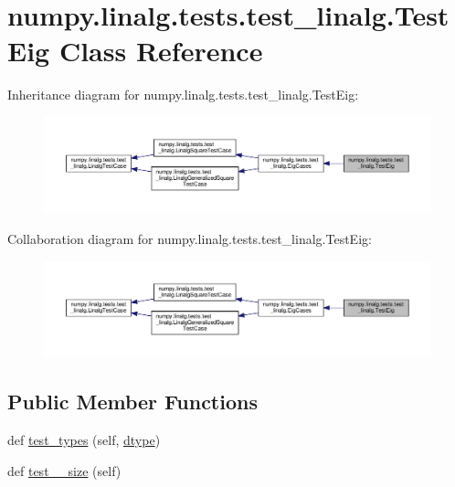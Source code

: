 \hypertarget{classnumpy_1_1linalg_1_1tests_1_1test__linalg_1_1TestEig}{}\section{numpy.\+linalg.\+tests.\+test\+\_\+linalg.\+Test\+Eig Class Reference}
\label{classnumpy_1_1linalg_1_1tests_1_1test__linalg_1_1TestEig}


Inheritance diagram for numpy.\+linalg.\+tests.\+test\+\_\+linalg.\+Test\+Eig\+:
\nopagebreak
\begin{figure}[H]
\begin{center}
\leavevmode
\includegraphics[width=350pt]{classnumpy_1_1linalg_1_1tests_1_1test__linalg_1_1TestEig__inherit__graph}
\end{center}
\end{figure}


Collaboration diagram for numpy.\+linalg.\+tests.\+test\+\_\+linalg.\+Test\+Eig\+:
\nopagebreak
\begin{figure}[H]
\begin{center}
\leavevmode
\includegraphics[width=350pt]{classnumpy_1_1linalg_1_1tests_1_1test__linalg_1_1TestEig__coll__graph}
\end{center}
\end{figure}
\subsection*{Public Member Functions}
\begin{DoxyCompactItemize}
\item 
def \hyperlink{classnumpy_1_1linalg_1_1tests_1_1test__linalg_1_1TestEig_a002546476c51b593c41da6da3ec8fa51}{test\+\_\+types} (self, \hyperlink{namespacenumpy_1_1linalg_1_1tests_1_1test__linalg_a1063ea74fa35b7244592f8a89b8a71a2}{dtype})
\item 
def \hyperlink{classnumpy_1_1linalg_1_1tests_1_1test__linalg_1_1TestEig_a29ac04519b617d2ce3f9049085c24ebb}{test\+\_\+\_\+size} (self)
\end{DoxyCompactItemize}
